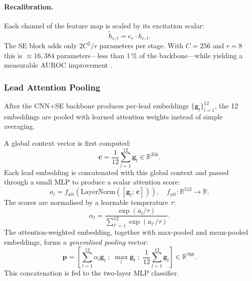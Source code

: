 \paragraph{Recalibration.}
Each channel of the feature map is scaled by its excitation scalar:
\begin{equation}
  \tilde{h}_{c,t} = e_c \cdot h_{c,t}.
  \label{eq:recalibration}
\end{equation}
The SE block adds only $2C^2/r$ parameters per stage.
With $C=256$ and $r=8$ this is $\approx 16{,}384$ parameters---less than
1\,\% of the backbone---while yielding a measurable AUROC improvement
\cite{ref8,ref36}.

\subsubsection{Lead Attention Pooling}

After the CNN+SE backbone produces per-lead embeddings
$\{\mathbf{g}_l\}_{l=1}^{12}$, the 12 embeddings are pooled with
learned attention weights instead of simple averaging.

A global context vector is first computed:
\begin{equation}
  \mathbf{c} = \frac{1}{12}\sum_{l=1}^{12}\mathbf{g}_l \in \mathbb{R}^{256}.
  \label{eq:global_ctx}
\end{equation}
Each lead embedding is concatenated with this global context and passed
through a small MLP to produce a scalar attention score:
\begin{equation}
  a_l = f_\mathrm{att}\!\left(
    \mathrm{LayerNorm}([\mathbf{g}_l;\, \mathbf{c}])
  \right),\quad
  f_\mathrm{att}: \mathbb{R}^{512} \to \mathbb{R}.
  \label{eq:lead_att_score}
\end{equation}
The scores are normalised by a learnable temperature $\tau$:
\begin{equation}
  \alpha_l = \frac{\exp(a_l / \tau)}{\sum_{l'=1}^{12}\exp(a_{l'} / \tau)}.
  \label{eq:lead_softmax}
\end{equation}
The attention-weighted embedding, together with max-pooled and
mean-pooled embeddings, forms a \emph{generalised pooling} vector:
\begin{equation}
  \mathbf{p} = \left[
    \sum_{l=1}^{12}\alpha_l \mathbf{g}_l
    \;;\;
    \max_l \mathbf{g}_l
    \;;\;
    \frac{1}{12}\sum_{l=1}^{12}\mathbf{g}_l
  \right] \in \mathbb{R}^{768}.
  \label{eq:gen_pool}
\end{equation}
This concatenation is fed to the two-layer MLP classifier.

